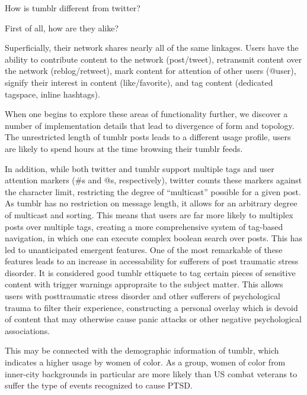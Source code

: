 How is tumblr different from twitter?

First of all, how are they alike?

Superficially, their network shares nearly all of the same linkages.  
Users have the ability to contribute content to the network (post/tweet), 
retransmit content over the network (reblog/retweet), mark content for 
attention of other users (@user), signify their interest in content 
(like/favorite), and tag content (dedicated tagspace, inline hashtags).

When one begins to explore these areas of functionality further, we 
discover a number of implementation details that lead to divergence 
of form and topology.  The unrestricted length of tumblr posts leads to 
a different usage profile, users are likely to spend hours at the 
time\cite{duggan2013demographics} browsing their tumblr feeds.  

In addition, while both twitter and tumblr support multiple tags and 
user attention markers (#s and @s, respectively), twitter counts these 
markers against the character limit, restricting the degree of 
``multicast'' possible for a given post.  As tumblr has no restriction 
on message length, it allows for an arbitrary degree of multicast and 
sorting.  This means that users are far more likely to multiplex posts 
over multiple tags, creating a more comprehensive system of tag-based 
navigation, in which one can execute complex boolean search over posts.  
This has led to unanticipated emergent features. One of the most 
remarkable of these features leads to an increase in accessability for 
sufferers of post traumatic stress disorder.  It is considered good 
tumblr ettiquete to tag certain pieces of sensitive content with trigger 
warnings appropraite to the subject matter.  This allows users with 
posttraumatic stress disorder and other sufferers of psychological 
trauma to filter their experience, constructing a personal overlay 
which is devoid of content that may otherwise cause panic attacks or 
other negative psychological associations.


This may be connected with the demographic information of tumblr, which 
indicates a higher usage by women of color.  As a group, women of color 
from inner-city backgrounds in particular are more likely than US combat 
veterans to suffer the type of events recognized to cause PTSD.





